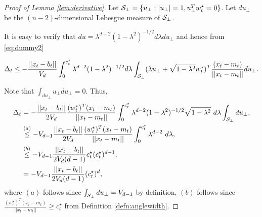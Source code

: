 \begin{proof}[Proof of Lemma \ref{lem:derivative}]
Let $\mathcal{S}_{\perp} = \{u_\perp: |u_\perp|=1 , u_\perp^T w_t^\star=0\}$. Let $du_{\perp}$ be the 
$(n-2)$-dimensional Lebesgue measure of $\mathcal{S}_{\perp}$. 

It is easy to verify that 
$du = \lambda^{d-2}(1-\lambda^2)^{-1/2} d\lambda du_{\perp}$ and hence from \eqref{eq:dummy2}

\begin{equation}\label{eq:dummy3}
\Delta_t  \le -\frac{||x_t-b_t||}{V_d} \int_{0}^{c_t^\star}  \lambda^{d-2}(1-\lambda^2)^{-1/2} d\lambda \int_{\mathcal{S}_{\perp}} (\lambda u_{\perp} + \sqrt{1-\lambda^2} w_t^\star)^T \frac{(x_t-m_t)}{||x_t-m_t||}  du_{\perp}.
\end{equation}
 
 Note that $\int_{du_{\perp}} u_{\perp} du_{\perp}=0$. Thus,
 \begin{align}\nn \label{}
\Delta_t  & = -\frac{||x_t-b_t||}{2V_d} \frac{(w_t^\star)^T(x_t-m_t)}{||x_t-m_t||}  \int_{0}^{c_t^\star}  \lambda^{d-2}(1-\lambda^2)^{-1/2}   \sqrt{1-\lambda^2}\ d\lambda   \int_{\cS_{\perp}} du_{\perp},\\ 
\nn
& \stackrel{(a)}\le -V_{d-1} \frac{||x_t-b_t||}{2V_d}  \frac{ (w_t^\star)^T(x_t-m_t)}{||x_t-m_t||}  \int_{0}^{c_t^\star} \lambda^{d-2}\ d\lambda, \\ \nn
& \stackrel{(b)}\le  -V_{d-1}\frac{||x_t-b_t||}{2V_d(d-1)} c_t^\star (c_t^\star)^{d-1},\\ 
& = -V_{d-1}\frac{||x_t-b_t||}{2V_d(d-1)}  (c_t^\star)^{d},
\end{align}
where $(a)$ follows since  $\int_{\mathcal{S}_{\perp}} du_{\perp} = V_{d-1}$ by definition, $(b)$ follows since $ \frac{(w_t^\star)^T(x_t-m_t)}{||x_t-m_t||} \ge c_t^\star$ from Definition \ref{defn:anglewidth}.



 \end{proof}
 
